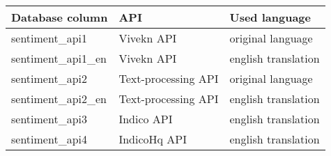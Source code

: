 \begin{table}[H]
\centering
\onehalfspacing

\begin{tabularx}{0.95\textwidth}{ X || X | X }
	\hline
	\textbf{Database column} &  \textbf{API} & \textbf{Used language}  \\
	\hline
	sentiment\_api1 & Vivekn API & original language  \\
	sentiment\_api1\_en & Vivekn API & english translation  \\
	sentiment\_api2 & Text-processing API & original language  \\
	sentiment\_api2\_en & Text-processing API & english translation  \\
	sentiment\_api3  & Indico API & english translation  \\
	sentiment\_api4  & IndicoHq API & english translation  \\
	\hline
\end{tabularx}
\label{tab:colmumn-api-mappings}

\end{table}